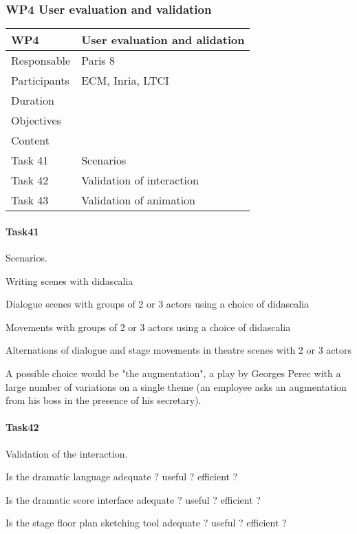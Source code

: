 \subsubsection{WP4 User evaluation and validation}


\begin{center}
\begin{tabular}{|l|l|}\hline
WP4 &  User evaluation and alidation \\\hline
Responsable &  Paris 8  \\\hline
Participants &  ECM, Inria, LTCI\\\hline
Duration  &   \\\hline
Objectives &   \\\hline
Content &  \\\hline
Task 41 & Scenarios  \\\hline
Task 42 &  Validation of interaction\\\hline
Task 43 &  Validation of animation  \\\hline
\end{tabular}
\end{center}

\paragraph{Task41} Scenarios.

Writing scenes with didascalia 

Dialogue scenes with groups of 2 or  3  actors using a choice of didascalia

Movements with groups of 2 or 3 actors using a choice of didascalia

Alternations of dialogue and stage movements in theatre scenes with 2 or 3 actors

A possible choice would be "the augmentation", a play by Georges Perec with a large number of variations
on a single theme (an employee asks an augmentation from his boss in the presence of his secretary).



\paragraph{Task42} Validation of the interaction.

Is the dramatic language adequate ? useful ?  efficient  ? 

Is the dramatic score interface  adequate ? useful ?  efficient  ? 

Is the stage floor plan sketching tool adequate ? useful ?  efficient  ? 



